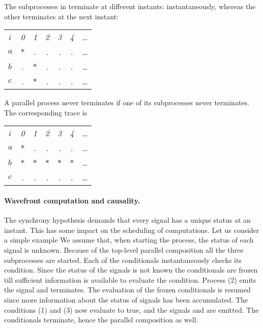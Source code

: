 The subprocesses in
%
%
terminate at different instants:  instantaneously, whereas
the other terminates at the next instant:
\begin{center}
  \leavevmode
  \begin{tabular}[]{l@{\quad}||@{\quad} cccccc}
    \hline\hline   
     \hbox{{\footnotesize \textit{i}}} &{\footnotesize \textit{0}}
     &{\footnotesize \textit{1}}&{\footnotesize \textit{2}}
     &{\footnotesize \textit{3}}&{\footnotesize \textit{4}}&\ldots
   \\  
    \hbox{$a$} &$*$&.&.&.&.&\ldots
   \\
    \hbox{$b$} &.&$*$&.&.&.&\ldots
   \\
    \hbox{$c$} &.&$*$&.&.&.&\ldots
    \\   
    \hline\hline
  \end{tabular}
\end{center}

A parallel process never terminates if one of its subprocesses never terminates.
%
%
The corresponding trace is
\begin{center}
  \leavevmode
  \begin{tabular}[]{l@{\quad}||@{\quad} cccccc}
    \hline\hline   
     \hbox{{\footnotesize \textit{i}}} &{\footnotesize \textit{0}}
     &{\footnotesize \textit{1}}&{\footnotesize \textit{2}}
     &{\footnotesize \textit{3}}&{\footnotesize \textit{4}}&\ldots
   \\  
    \hbox{$a$} &$*$&.&.&.&.&\ldots
   \\
    \hbox{$b$} &$*$&$*$&$*$&$*$&$*$&\ldots
   \\
    \hbox{$c$} &.&.&.&.&.&\ldots
    \\   
    \hline\hline
  \end{tabular}
\end{center}


\paragraph{Wavefront computation
 and causality.}\label{causality} The 
synchrony hypothesis demands that every signal has a unique status at 
an instant.  This has some impact on the scheduling of computations.  
Let us consider a simple example
% 
% 
We assume that, when starting the process, the status of each signal
is unknown.  Because of the top-level parallel composition all the
three subprocesses are started.  Each of the conditionals
instantaneously checks its condition.  Since the status of the signals
is not known the conditionals are frozen till sufficient information
is available to evaluate the condition.  Process (2) emits the signal
 and terminates.  The evaluation of the frozen conditionals is
resumed since more information about the status of signals has been
accumulated.  The conditions (1) and (3) now evaluate to true, and the
signals  and  are emitted.  The conditionals terminate, 
hence the parallel composition as well.

